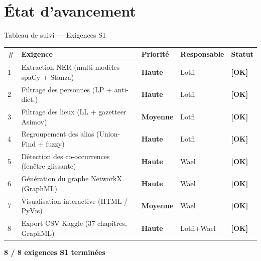 \documentclass[aspectratio=169]{beamer}
\newcommand{\done}{\textcolor{done}{\textbf{[OK]}}}
\newcommand{\high}{\textcolor{red!80!black}{\textbf{Haute}}}
\newcommand{\med}{\textcolor{orange!80!black}{\textbf{Moyenne}}}
\begin{document}
\section{État d'avancement}

\begin{frame}{Tableau de suivi --- Exigences S1}
  \footnotesize
  \setlength{\tabcolsep}{4pt}
  \renewcommand{\arraystretch}{1.25}
  \begin{tabularx}{\textwidth}{>{\centering\arraybackslash}p{0.3cm}
                               X
                               >{\centering\arraybackslash}p{1.5cm}
                               >{\centering\arraybackslash}p{1.8cm}
                               >{\centering\arraybackslash}p{1.4cm}}
    \toprule
    \textbf{\#} & \textbf{Exigence} & \textbf{Priorité} & \textbf{Responsable} & \textbf{Statut} \\
    \midrule
    \rowcolor{rowdone}1 & Extraction NER (multi-modèles spaCy + Stanza) & \high & Lotfi & \done \\
    \rowcolor{rowdone}2 & Filtrage des personnes (LP + anti-dict.)       & \high & Lotfi & \done \\
    \rowcolor{rowdone}3 & Filtrage des lieux (LL + gazetteer Asimov)     & \med  & Lotfi & \done \\
    \rowcolor{rowdone}4 & Regroupement des alias (Union-Find + fuzzy)    & \high & Lotfi & \done \\
    \rowcolor{rowdone}5 & Détection des co-occurrences (fenêtre glissante) & \high & Wael & \done \\
    \rowcolor{rowdone}6 & Génération du graphe NetworkX (GraphML)        & \high & Wael & \done \\
    \rowcolor{rowdone}7 & Visualisation interactive (HTML / PyVis)       & \med  & Wael & \done \\
    \rowcolor{rowdone}8 & Export CSV Kaggle (37 chapitres, GraphML)      & \high & Lotfi+Wael & \done \\
    \bottomrule
  \end{tabularx}
  \vspace{4pt}
  \begin{center}
    \textcolor{done}{\textbf{8 / 8 exigences S1 terminées}}
  \end{center}
\end{frame}
\end{document}
